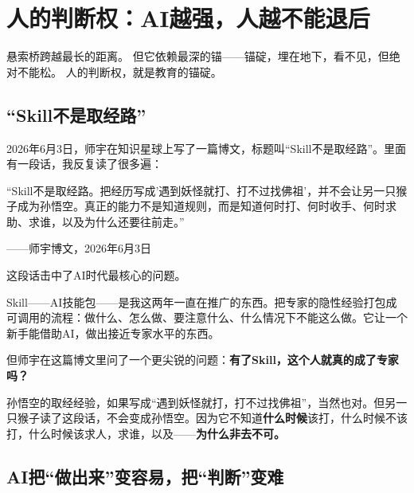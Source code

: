 
\chapter{人的判断权：AI越强，人越不能退后}

\vspace{0.5cm}

\begin{center}
{\small\color{muted} 悬索桥跨越最长的距离。}
{\small\color{muted} 但它依赖最深的锚——锚碇，埋在地下，看不见，但绝对不能松。}
{\small\color{muted} 人的判断权，就是教育的锚碇。}
\end{center}

\vspace{1cm}

\section{``Skill不是取经路''}

2026年6月3日，师宇在知识星球上写了一篇博文，标题叫``Skill不是取经路''。里面有一段话，我反复读了很多遍：

\begin{shiyu-inline}
``Skill不是取经路。把经历写成'遇到妖怪就打、打不过找佛祖'，并不会让另一只猴子成为孙悟空。真正的能力不是知道规则，而是知道何时打、何时收手、何时求助、求谁，以及为什么还要往前走。''

\hfill ——师宇博文，2026年6月3日
\end{shiyu-inline}

这段话击中了AI时代最核心的问题。

Skill——AI技能包——是我这两年一直在推广的东西。把专家的隐性经验打包成可调用的流程：做什么、怎么做、要注意什么、什么情况下不能这么做。它让一个新手能借助AI，做出接近专家水平的东西。

但师宇在这篇博文里问了一个更尖锐的问题：\textbf{有了Skill，这个人就真的成了专家吗？}

孙悟空的取经经验，如果写成``遇到妖怪就打，打不过找佛祖''，当然也对。但另一只猴子读了这段话，不会变成孙悟空。因为它不知道\textbf{什么时候}该打，什么时候不该打，什么时候该求人，求谁，以及——\textbf{为什么非去不可。}

\section{AI把``做出来''变容易，把``判断''变难}


